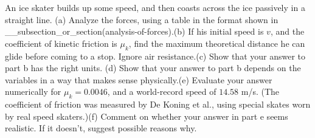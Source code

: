 An ice skater builds up some speed, and then coasts across the ice passively in
a straight line. (a) Analyze the forces, using
a table in the format shown in __subsection_or_section(analysis-of-forces).\hwendpart (b) If his initial speed is $v$, and the
coefficient of kinetic friction is $\mu_k$, find the maximum theoretical distance he can glide before
coming to a stop. Ignore air resistance.\answercheck\hwendpart (c) Show that your answer to part b has the right units.\hwendpart
(d) Show that your answer to part b depends on the variables in a way that makes
sense physically.\hwendpart (e) Evaluate your answer numerically for $\mu_k=0.0046$, and a
world-record speed of $14.58$ m/s. (The coefficient of friction was measured by
De Koning et al., using special skates worn by real speed skaters.)\answercheck\hwendpart (f) Comment on whether
your answer in part e seems realistic. If it doesn't, suggest possible reasons why.\hwendpart
